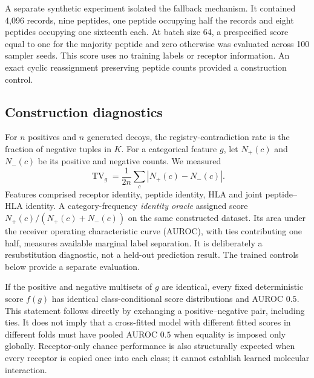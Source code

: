 \documentclass[pdflatex,sn-basic,Numbered]{sn-jnl}
\newcommand{\TV}{\operatorname{TV}}
\begin{document}
A separate synthetic experiment isolated the fallback mechanism. It contained 4,096 records, nine peptides, one peptide occupying half the records and eight peptides occupying one sixteenth each. At batch size 64, a prespecified score equal to one for the majority peptide and zero otherwise was evaluated across 100 sampler seeds. This score uses no training labels or receptor information. An exact cyclic reassignment preserving peptide counts provided a construction control.

\subsection{Construction diagnostics}
For $n$ positives and $n$ generated decoys, the registry-contradiction rate is the fraction of negative tuples in $K$. For a categorical feature $g$, let $N_+(c)$ and $N_-(c)$ be its positive and negative counts. We measured
\begin{equation}
\TV_g=\frac{1}{2n}\sum_c\left|N_+(c)-N_-(c)\right|.
\label{eq:tv}
\end{equation}
Features comprised receptor identity, peptide identity, HLA and joint peptide--HLA identity. A category-frequency \emph{identity oracle} assigned score $N_+(c)/(N_+(c)+N_-(c))$ on the same constructed dataset. Its area under the receiver operating characteristic curve (AUROC), with ties contributing one half, measures available marginal label separation. It is deliberately a resubstitution diagnostic, not a held-out prediction result. The trained controls below provide a separate evaluation.

If the positive and negative multisets of $g$ are identical, every fixed deterministic score $f(g)$ has identical class-conditional score distributions and AUROC $0.5$. This statement follows directly by exchanging a positive--negative pair, including ties. It does not imply that a cross-fitted model with different fitted scores in different folds must have pooled AUROC $0.5$ when equality is imposed only globally. Receptor-only chance performance is also structurally expected when every receptor is copied once into each class; it cannot establish learned molecular interaction.
\end{document}
